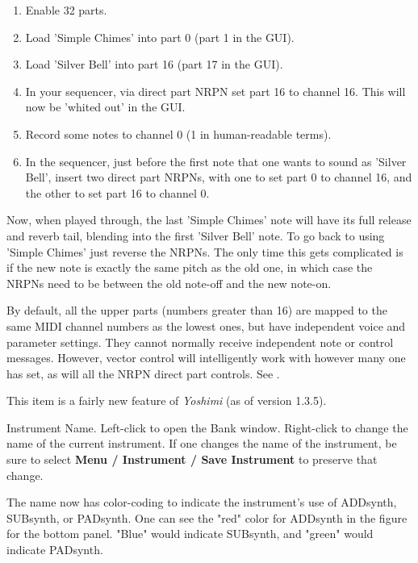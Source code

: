    \begin{enumerate}
      \item Enable 32 parts.
      \item Load 'Simple Chimes' into part 0 (part 1 in the GUI).
      \item Load 'Silver Bell' into part 16 (part 17 in the GUI).
      \item In your sequencer, via direct part NRPN set part 16 to channel 16.
          This will now be 'whited out' in the GUI.
      \item Record some notes to channel 0 (1 in human-readable terms).
      \item In the sequencer, just before the first note that one wants to
         sound as 'Silver Bell', insert two direct part NRPNs, with one to set
         part 0 to channel 16, and the other to set part 16 to channel 0.
   \end{enumerate}

   Now, when played through, the last 'Simple Chimes' note will have its full
   release and reverb tail, blending into the first 'Silver Bell' note.  To go
   back to using 'Simple Chimes' just reverse the NRPNs.  The only time this
   gets complicated is if the new note is exactly the same pitch as the old
   one, in which case the NRPNs need to be between the old note-off and the new
   note-on.

   By default, all the upper parts (numbers greater than 16)
   are mapped to the same MIDI channel
   numbers as the lowest ones, but have independent voice and parameter
   settings. They cannot normally receive independent note or control
   messages. However, vector control will intelligently work with however
   many one has set, as will all the NRPN direct part controls.
   See .

   This item is a fairly new feature of \textsl{Yoshimi} (as of version
   1.3.5).
   
   Instrument Name.
   Left-click to open the Bank window.
   Right-click to change the name of the current instrument.
   If one changes the name of the instrument, be sure to select
   \textbf{Menu / Instrument / Save Instrument} to preserve that change.

   The name now has color-coding to indicate the instrument's use of
   ADDsynth, SUBsynth, or PADsynth.  One can see the "red" color for ADDsynth
   in the figure for the bottom panel.  "Blue" would indicate SUBsynth, and
   "green" would indicate PADsynth.

